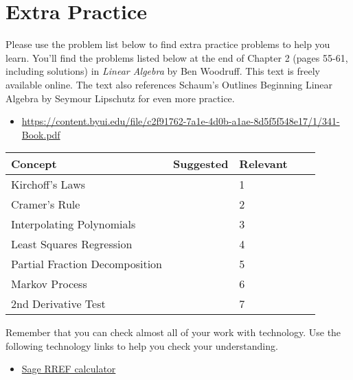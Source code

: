 
\section*{Extra Practice}

Please use the problem list below to find extra practice problems to help you learn.  You'll find the problems listed below  at the end of Chapter 2 (pages 55-61, including solutions) in {\it Linear Algebra} by Ben Woodruff. This text is freely available online. The text also references Schaum's Outlines Beginning Linear Algebra by Seymour Lipschutz for even more practice. 
\begin{itemize}
 \item \href{https://content.byui.edu/file/c2f91762-7a1e-4d0b-a1ae-8d5f5f548e17/1/341-Book.pdf}{https://content.byui.edu/file/c2f91762-7a1e-4d0b-a1ae-8d5f5f548e17/1/341-Book.pdf}
\end{itemize}
\begin{center}
\begin{tabular}{|l|l|l|l|l|}
\hline
Concept&Suggested&Relevant\\ \hline
Kirchoff's Laws&&1\\ \hline
Cramer's Rule&&2\\ \hline
Interpolating Polynomials&&3\\ \hline
Least Squares Regression&&4\\ \hline
Partial Fraction Decomposition&&5\\ \hline
Markov Process&&6\\ \hline
2nd Derivative Test&&7\\ \hline
\end{tabular}
\end{center}


Remember that you can check almost all of your work with technology.  Use the following technology links to help you check your understanding.
\begin{itemize}
 \item \href{\urlrref}{Sage RREF calculator}
\end{itemize}








\restoregeometry
